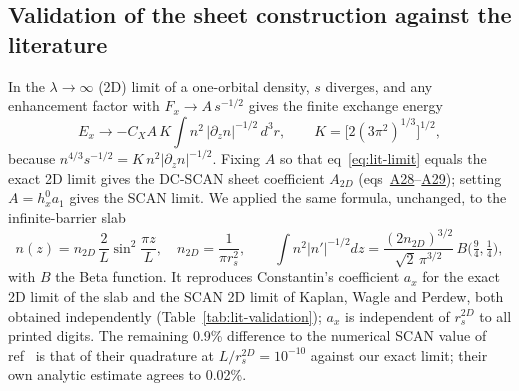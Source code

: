 \documentclass[journal=jctcce,manuscript=suppinfo]{achemso}
\newcommand{\novelty}[1]{{\color{red}#1}}
\begin{document}
\subsection{Validation of the sheet construction against the literature}
\label{sec:lit-validation}
\novelty{In the $\lambda\to\infty$ (2D) limit of a one-orbital density, $s$ diverges, and any
enhancement factor with $F_x\to A\,s^{-1/2}$ gives the finite exchange energy
\begin{equation}
E_x\to-C_XA\,K\int n^2\,|\partial_zn|^{-1/2}\,d^3r,\qquad K=\bigl[2(3\pi^2)^{1/3}\bigr]^{1/2},
\label{eq:lit-limit}
\end{equation}
because $n^{4/3}s^{-1/2}=K\,n^2|\partial_zn|^{-1/2}$.  Fixing $A$ so that
eq~\ref{eq:lit-limit} equals the exact 2D limit gives the DC-SCAN sheet coefficient
$A_{2D}$ (eqs~\href{main.pdf\#equation.28}{A28}--\href{main.pdf\#equation.29}{A29}); setting $A=h_x^0a_1$ gives the
SCAN limit.  We applied the same formula, unchanged, to the infinite-barrier slab
\begin{equation}
n(z)=n_{2D}\,\frac{2}{L}\sin^2\frac{\pi z}{L},\quad n_{2D}=\frac{1}{\pi r_s^2},\qquad
\int n^2|n'|^{-1/2}dz=\frac{(2n_{2D})^{3/2}}{\sqrt2\,\pi^{3/2}}\,B\bigl(\tfrac94,\tfrac14\bigr),
\label{eq:lit-slab}
\end{equation}
with $B$ the Beta function.
It reproduces Constantin's coefficient $a_x$ for the exact 2D limit of the slab and
the SCAN 2D limit of Kaplan, Wagle and Perdew, both obtained independently
(Table~\ref{tab:lit-validation}); $a_x$ is independent of $r_s^{2D}$ to all printed
digits.  The remaining 0.9\% difference to the numerical SCAN value of
ref~\citenum{kaplan2018collapse} is that of their quadrature at
$L/r_s^{2D}=10^{-10}$ against our exact limit; their own analytic estimate agrees
to 0.02\%.}
\end{document}
